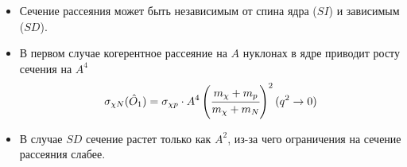 \begin{itemize}
	\item Сечение рассеяния может быть независимым от спина ядра ($SI$) и зависимым ($SD$). 
	\item В первом случае когерентное рассеяние на $A$ нуклонах в ядре приводит росту сечения на $A^4$
	\begin{equation*}
		\sigma_{\chi N}(\hat{O}_1) = \sigma_{\chi p}\cdot A^4 \left(\cfrac{m_{\chi}+m_{p}}{m_{\chi} + m_{N}}\right)^2 (q^2 \rightarrow 0)
	\end{equation*}
	\item В случае $SD$ сечение растет только как $A^2$, из-за чего ограничения на сечение рассеяния слабее.
\end{itemize}